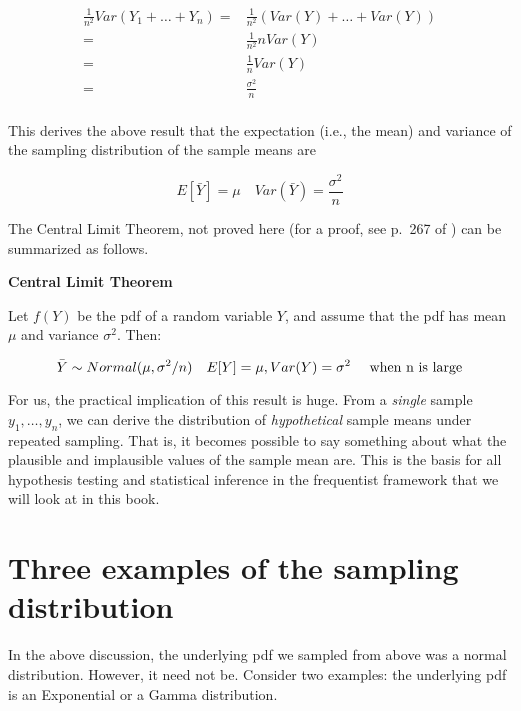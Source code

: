 \documentclass[12pt,]{krantz}
\begin{document}
\begin{equation} \label{sdsmderivation}
\begin{split}
\frac{1}{n^2} Var(Y_1 + \dots + Y_n) =& \frac{1}{n^2} (Var(Y) + \dots + Var(Y))\\
=&  \frac{1}{n^2}  n Var(Y)\\
=&  \frac{1}{n}  Var(Y)\\
=&  \frac{\sigma^2}{n}\\
\end{split}
\end{equation}

This derives the above result that the expectation (i.e., the mean) and variance of the sampling distribution of the sample means are

\begin{equation}
E[\bar{Y}] = \mu \quad Var(\bar{Y}) = \frac{\sigma^2}{n}
\end{equation}

The Central Limit Theorem, not proved here (for a proof, see p.~267 of \citet{millermiller}) can be summarized as follows.

\textbf{Central Limit Theorem}

Let \(f(Y)\) be the pdf of a random variable \(Y\), and assume that the pdf has mean \(\mu\) and variance \(\sigma^2\). Then:

\begin{equation}
\bar{Y} \sim Normal(\mu,\sigma^2/n) \quad  E[Y]=\mu,Var(Y)=\sigma^2 \quad \hbox{ when n is large}
\end{equation}

For us, the practical implication of this result is huge. From a \emph{single} sample \(y_1,\dots, y_n\), we can derive the distribution of \emph{hypothetical} sample means under repeated sampling. That is, it becomes possible to say something about what the plausible and implausible values of the sample mean are. This is the basis for all hypothesis testing and statistical inference in the frequentist framework that we will look at in this book.

\hypertarget{three-examples-of-the-sampling-distribution}{%
\section{Three examples of the sampling distribution}\label{three-examples-of-the-sampling-distribution}}

In the above discussion, the underlying pdf we sampled from above was a normal distribution. However, it need not be. Consider two examples: the underlying pdf is an Exponential or a Gamma distribution.
\end{document}
